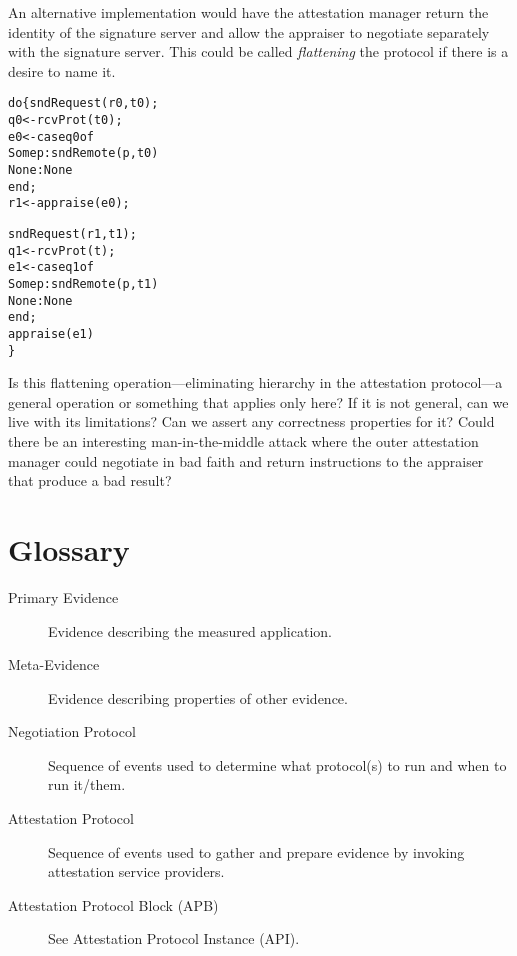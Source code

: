 \documentclass[10pt]{article}
\begin{document}
An alternative implementation would have the attestation manager
return the identity of the signature server and allow the appraiser to
negotiate separately with the signature server.  This could be called
\emph{flattening} the protocol if there is a desire to name it.

\begin{alltt}
  do \{ sndRequest(r0,t0);
       q0 <- rcvProt(t0);
       e0 <- case q0 of
               Some p : sndRemote(p,t0)
               None : None
             end;
       r1 <- appraise(e0);
       
       sndRequest(r1,t1);
       q1 <- rcvProt(t);
       e1 <- case q1 of
               Some p : sndRemote(p,t1)
               None : None
             end;
       appraise(e1)
  \}
\end{alltt}

Is this flattening operation---eliminating hierarchy in the
attestation protocol---a general operation or something that applies
only here?  If it is not general, can we live with its limitations?
Can we assert any correctness properties for it?  Could there be an
interesting man-in-the-middle attack where the outer attestation
manager could negotiate in bad faith and return instructions to the
appraiser that produce a bad result?

\appendix

\section{Glossary}

\begin{description}
\item[Primary Evidence] Evidence describing the measured application.
\item[Meta-Evidence] Evidence describing properties of other evidence.
\item[Negotiation Protocol] Sequence of events used to determine what
  protocol(s) to run and when to run it/them.
\item[Attestation Protocol] Sequence of events used to gather and
  prepare evidence by invoking attestation service providers.
\item[Attestation Protocol Block (APB)] See Attestation Protocol
  Instance (API).
\end{description}



\end{document}
